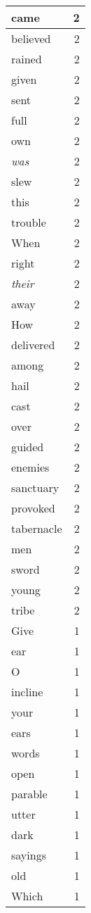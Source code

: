 \begin{center}
\begin{longtable}{l|r}
came & 2\\ \hline 
believed & 2\\ \hline 
rained & 2\\ \hline 
given & 2\\ \hline 
sent & 2\\ \hline 
full & 2\\ \hline 
own & 2\\ \hline 
\emph{was} & 2\\ \hline 
slew & 2\\ \hline 
this & 2\\ \hline 
trouble & 2\\ \hline 
When & 2\\ \hline 
right & 2\\ \hline 
\emph{their} & 2\\ \hline 
away & 2\\ \hline 
How & 2\\ \hline 
delivered & 2\\ \hline 
among & 2\\ \hline 
hail & 2\\ \hline 
cast & 2\\ \hline 
over & 2\\ \hline 
guided & 2\\ \hline 
enemies & 2\\ \hline 
sanctuary & 2\\ \hline 
provoked & 2\\ \hline 
tabernacle & 2\\ \hline 
men & 2\\ \hline 
sword & 2\\ \hline 
young & 2\\ \hline 
tribe & 2\\ \hline 
Give & 1\\ \hline 
ear & 1\\ \hline 
O & 1\\ \hline 
incline & 1\\ \hline 
your & 1\\ \hline 
ears & 1\\ \hline 
words & 1\\ \hline 
open & 1\\ \hline 
parable & 1\\ \hline 
utter & 1\\ \hline 
dark & 1\\ \hline 
sayings & 1\\ \hline 
old & 1\\ \hline 
Which & 1\\ \hline 

\end{longtable}
\end{center}
